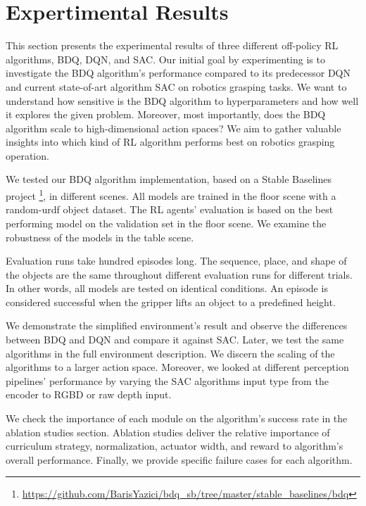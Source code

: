 
\chapter{Expertimental Results}\label{chapter:evaluation}

This section presents the experimental results of three different off-policy RL algorithms, BDQ, DQN, and SAC. Our initial goal by experimenting is to investigate the BDQ algorithm's performance compared to its predecessor DQN and current state-of-art algorithm SAC on robotics grasping tasks. We want to understand how sensitive is the BDQ algorithm to hyperparameters and how well it explores the given problem. Moreover, most importantly, does the BDQ algorithm scale to high-dimensional action spaces? We aim to gather valuable insights into which kind of RL algorithm performs best on robotics grasping operation.

We tested our BDQ algorithm implementation, based on a Stable Baselines project \footnote{\url{https://github.com/BarisYazici/bdq_sb/tree/master/stable_baselines/bdq}}, in different scenes. All models are trained in the floor scene with a random-urdf object dataset. The RL agents' evaluation is based on the best performing model on the validation set in the floor scene. We examine the robustness of the models in the table scene.

Evaluation runs take hundred episodes long. The sequence, place, and shape of the objects are the same throughout different evaluation runs for different trials. In other words, all models are tested on identical conditions. An episode is considered successful when the gripper lifts an object to a predefined height.

We demonstrate the simplified environment's result and observe the differences between BDQ and DQN and compare it against SAC. Later, we test the same algorithms in the full environment description. We discern the scaling of the algorithms to a larger action space. Moreover, we looked at different perception pipelines' performance by varying the SAC algorithms input type from the encoder to RGBD or raw depth input. 

We check the importance of each module on the algorithm's success rate in the ablation studies section.  Ablation studies deliver the relative importance of curriculum strategy, normalization, actuator width, and reward to algorithm's overall performance. Finally, we provide specific failure cases for each algorithm.


